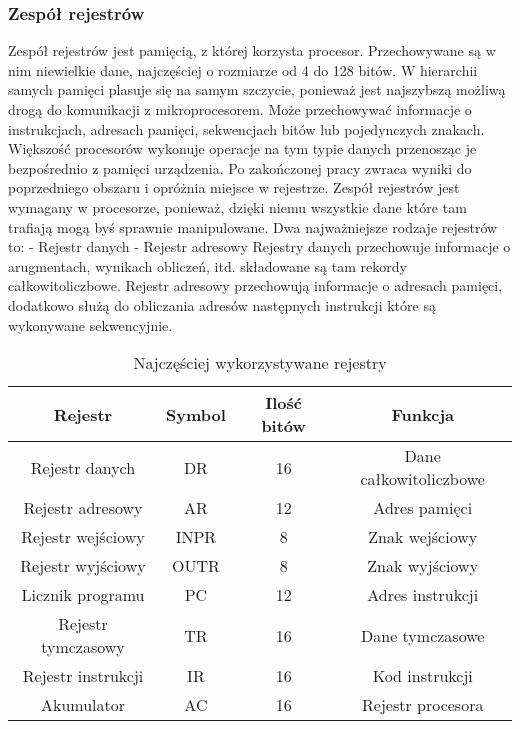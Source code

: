 \documentclass[12pt, a4paper, onside, polish]{article}				%
\begin{document}
\subsubsection{Zespół rejestrów}
\hspace{\parindent}
Zespół rejestrów jest pamięcią, z której korzysta procesor. Przechowywane są w nim niewielkie dane, najczęściej o rozmiarze od 4 do 128 bitów. W hierarchii samych pamięci plasuje się na samym szczycie, ponieważ jest najszybszą możliwą drogą do komunikacji z mikroprocesorem. Może przechowywać informacje o instrukcjach, adresach pamięci, sekwencjach bitów lub pojedynczych znakach.  Większość procesorów wykonuje operacje na tym typie danych przenosząc je bezpośrednio z pamięci urządzenia. Po zakończonej pracy zwraca wyniki do poprzedniego obszaru i opróżnia miejsce w rejestrze. Zespół rejestrów jest wymagany w procesorze, ponieważ, dzięki niemu wszystkie dane które tam trafiają mogą byś sprawnie manipulowane.  \newline\newline
Dwa najważniejsze rodzaje rejestrów to: \newline
- Rejestr danych \newline
- Rejestr adresowy \newline\newline
 Rejestry danych przechowuje informacje o arugmentach, wynikach obliczeń, itd.  składowane są tam rekordy całkowitoliczbowe.  \newline\newline
Rejestr adresowy przechowują informacje o adresach pamięci, dodatkowo służą do obliczania adresów następnych instrukcji które są wykonywane sekwencyjnie. 


\begin{table}[htb]
\caption{Najczęściej wykorzystywane rejestry}
\centering
\begin{tabular}{|c|c|c|c|}
\hline
\textbf{Rejestr}   & \textbf{Symbol} & \textbf{Ilość bitów} & \textbf{Funkcja}       \\ \hline
Rejestr danych     & DR              & 16                   & Dane całkowitoliczbowe \\ \hline
Rejestr adresowy   & AR              & 12                   & Adres pamięci          \\ \hline
Rejestr wejściowy  & INPR            & 8                    & Znak wejściowy         \\ \hline
Rejestr wyjściowy  & OUTR            & 8                    & Znak wyjściowy         \\ \hline
Licznik programu   & PC              & 12                   & Adres instrukcji       \\ \hline
Rejestr tymczasowy & TR              & 16                   & Dane tymczasowe        \\ \hline
Rejestr instrukcji & IR              & 16                   & Kod instrukcji         \\ \hline
Akumulator         & AC              & 16                   & Rejestr procesora      \\ \hline
\end{tabular}
\end{table}
\end{document}
